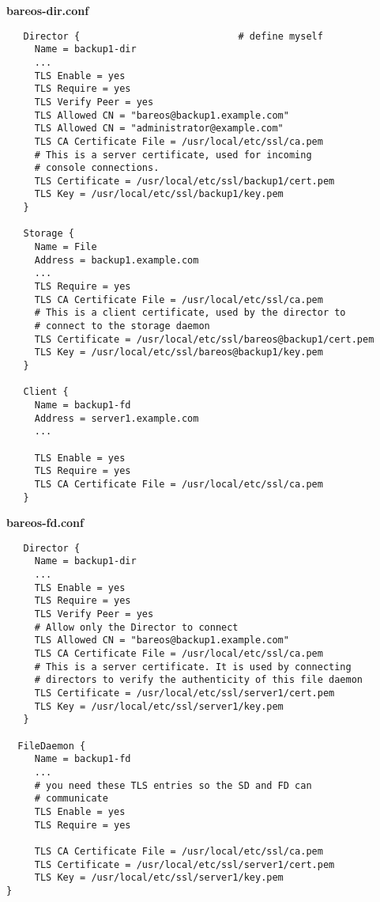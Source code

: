 {\bf bareos-dir.conf}
\footnotesize
\begin{verbatim}
   Director {                            # define myself
     Name = backup1-dir
     ...
     TLS Enable = yes
     TLS Require = yes
     TLS Verify Peer = yes
     TLS Allowed CN = "bareos@backup1.example.com"
     TLS Allowed CN = "administrator@example.com"
     TLS CA Certificate File = /usr/local/etc/ssl/ca.pem
     # This is a server certificate, used for incoming
     # console connections.
     TLS Certificate = /usr/local/etc/ssl/backup1/cert.pem
     TLS Key = /usr/local/etc/ssl/backup1/key.pem
   }

   Storage {
     Name = File
     Address = backup1.example.com
     ...
     TLS Require = yes
     TLS CA Certificate File = /usr/local/etc/ssl/ca.pem
     # This is a client certificate, used by the director to
     # connect to the storage daemon
     TLS Certificate = /usr/local/etc/ssl/bareos@backup1/cert.pem
     TLS Key = /usr/local/etc/ssl/bareos@backup1/key.pem
   }

   Client {
     Name = backup1-fd
     Address = server1.example.com
     ...

     TLS Enable = yes
     TLS Require = yes
     TLS CA Certificate File = /usr/local/etc/ssl/ca.pem
   }

\end{verbatim}
\normalsize

{\bf bareos-fd.conf}
\footnotesize
\begin{verbatim}
   Director {
     Name = backup1-dir
     ...
     TLS Enable = yes
     TLS Require = yes
     TLS Verify Peer = yes
     # Allow only the Director to connect
     TLS Allowed CN = "bareos@backup1.example.com"
     TLS CA Certificate File = /usr/local/etc/ssl/ca.pem
     # This is a server certificate. It is used by connecting
     # directors to verify the authenticity of this file daemon
     TLS Certificate = /usr/local/etc/ssl/server1/cert.pem
     TLS Key = /usr/local/etc/ssl/server1/key.pem
   }

  FileDaemon {
     Name = backup1-fd
     ...
     # you need these TLS entries so the SD and FD can
     # communicate
     TLS Enable = yes
     TLS Require = yes

     TLS CA Certificate File = /usr/local/etc/ssl/ca.pem
     TLS Certificate = /usr/local/etc/ssl/server1/cert.pem
     TLS Key = /usr/local/etc/ssl/server1/key.pem
}
\end{verbatim}
\normalsize

